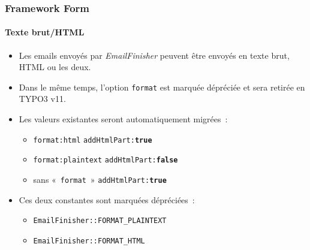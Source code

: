 \begin{frame}[fragile]
	\frametitle{Framework Form}
	\framesubtitle{Texte brut/HTML}

	\begin{itemize}
		\item Les emails envoyés par \textit{EmailFinisher} peuvent être envoyés en texte brut, HTML ou les deux.

		\item Dans le même temps, l'option \texttt{format} est marquée dépréciée et sera retirée en TYPO3 v11.

		\item Les valeurs existantes seront automatiquement migrées~:

			\begin{itemize}\smaller
				\item \texttt{format:html} \tabto{3cm}\textrightarrow\hspace{0.1cm}\texttt{addHtmlPart:\textbf{true}}
				\item \texttt{format:plaintext} \tabto{3cm}\textrightarrow\hspace{0.1cm}\texttt{addHtmlPart:\textbf{false}}
				\item sans «~\texttt{format}~» \tabto{3cm}\textrightarrow\hspace{0.1cm}\texttt{addHtmlPart:\textbf{true}}
			\end{itemize}\normalsize

		\item Ces deux constantes sont marquées dépréciées~:

			\begin{itemize}\smaller
				\item \texttt{EmailFinisher::FORMAT\_PLAINTEXT}
				\item \texttt{EmailFinisher::FORMAT\_HTML}
			\end{itemize}\normalsize

	\end{itemize}

\end{frame}


